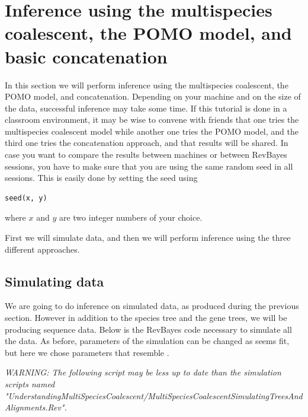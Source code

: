\documentclass[11pt]{article}
\begin{document}
\bigskip
\section{Inference using the multispecies coalescent, the POMO model, and basic concatenation}
In this section we will perform inference using the multispecies coalescent, the POMO model, and concatenation.
Depending on your machine and on the size of the data, successful inference may take some time.
If this tutorial is done in a classroom environment, it may be wise to convene with friends that one tries the multispecies coalescent model while another one tries the POMO model, and the third one tries the concatenation approach, and that results will be shared.
In case you want to compare the results between machines or between RevBayes sessions, you have to make sure that you are using the same random seed in all sessions. This is easily done by setting the seed using 
 {\tt \begin{snugshade*}
\begin{lstlisting}
seed(x, y)
\end{lstlisting}
\end{snugshade*}}
where $x$ and $y$ are two integer numbers of your choice.

First we will simulate data, and then we will perform inference using the three different approaches.

\subsection{Simulating data}
We are going to do inference on simulated data, as produced during the previous section.
However in addition to the species tree and the gene trees, we will be producing sequence data.
Below is the RevBayes code necessary to simulate all the data.
As before, parameters of the simulation can be changed as seems fit, but here we chose parameters that resemble \citet{Leache2011}.

{\begin{framed}
\begin{center}
\emph{WARNING: The following script may be less up to date than the simulation scripts named "UnderstandingMultiSpeciesCoalescent/MultiSpeciesCoalescentSimulatingTreesAndAlignments.Rev".}
\end{center}
\end{framed}}
\vspace{5mm}
\end{document}
